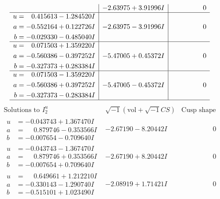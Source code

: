 \documentclass[1p]{elsarticle_modified}
\theoremstyle{definition}
\newcommand{\I}{\sqrt{-1}}
\begin{document}
$$\begin{array}{c|c|c}
 & -2.63975 + 3.91996 I & \phantom{-0.000000 } 0 \\ \hline\begin{aligned}
u &= \phantom{-}0.415613 - 1.284520 I \\
a &= -0.552164 + 0.122726 I \\
b &= -0.029330 - 0.485040 I\end{aligned}
 & -2.63975 - 3.91996 I & \phantom{-0.000000 } 0 \\ \hline\begin{aligned}
u &= \phantom{-}0.071503 + 1.359220 I \\
a &= -0.560386 - 0.397252 I \\
b &= -0.327373 + 0.283384 I\end{aligned}
 & -5.47005 + 0.45372 I & \phantom{-0.000000 } 0 \\ \hline\begin{aligned}
u &= \phantom{-}0.071503 - 1.359220 I \\
a &= -0.560386 + 0.397252 I \\
b &= -0.327373 - 0.283384 I\end{aligned}
 & -5.47005 - 0.45372 I & \phantom{-0.000000 } 0\\
 \hline 
 \end{array}$$\newpage$$\begin{array}{c|c|c}  
\text{Solutions to }I^u_{2}& \I (\text{vol} + \sqrt{-1}CS) & \text{Cusp shape}\\
 \hline 
\begin{aligned}
u &= -0.043743 + 1.367470 I \\
a &= \phantom{-}0.879746 - 0.353566 I \\
b &= -0.007654 - 0.709640 I\end{aligned}
 & -2.67190 - 8.20442 I & \phantom{-0.000000 } 0 \\ \hline\begin{aligned}
u &= -0.043743 - 1.367470 I \\
a &= \phantom{-}0.879746 + 0.353566 I \\
b &= -0.007654 + 0.709640 I\end{aligned}
 & -2.67190 + 8.20442 I & \phantom{-0.000000 } 0 \\ \hline\begin{aligned}
u &= \phantom{-}0.649661 + 1.212210 I \\
a &= -0.330143 - 1.290740 I \\
b &= -0.515101 + 1.023490 I\end{aligned}
 & -2.08919 + 1.71421 I & \phantom{-0.000000 } 0 \\ \hline\begin{aligned}

\end{aligned}
\end{array}$$
\end{document}
